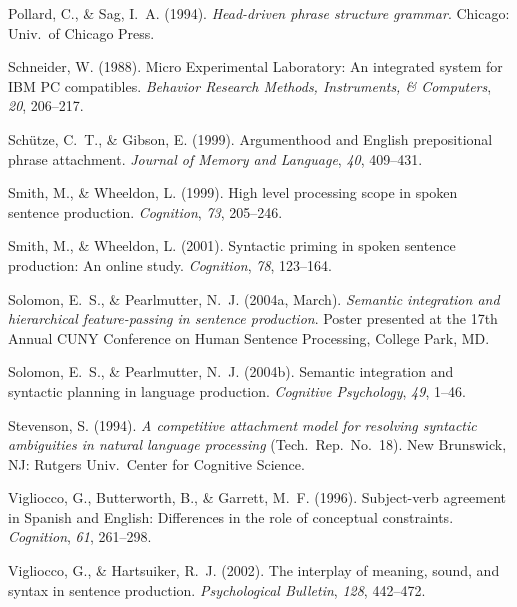 \documentclass[12pt,titlepage]{article}
\newcommand{\itt}{\textit}  %
\begin{document}
\begin{description}
    \item Pollard, C., \& Sag, I.~A\@.  (1994).  \itt{Head-driven phrase
    structure grammar}.  Chicago: Univ.\ of Chicago Press.

    \item Schneider, W\@.  (1988).  Micro Experimental Laboratory: An
    integrated system for IBM PC compatibles.  \itt{Behavior Research
    Methods, Instruments, \& Computers}, \itt{20}, 206--217.
    
    \item Sch\"{u}tze, C.~T., \& Gibson, E\@.  (1999).  Argumenthood and
    English prepositional phrase attachment.  \itt{Journal of Memory and
    Language}, \itt{40}, 409--431.

    \item Smith, M., \& Wheeldon, L\@.  (1999).  High level processing
    scope in spoken sentence production.  \itt{Cognition}, \itt{73},
    205--246.

    \item Smith, M., \& Wheeldon, L\@.  (2001).  Syntactic priming in
    spoken sentence production: An online study.  \itt{Cognition},
    \itt{78}, 123--164.

    \item Solomon, E.~S., \& Pearlmutter, N.~J\@.  (2004a, March).
    \itt{Semantic integration and hierarchical feature-passing in sentence
    production}.  Poster presented at the 17th Annual CUNY Conference on
    Human Sentence Processing, College Park, MD.
    
    \item Solomon, E.~S., \& Pearlmutter, N.~J\@.  (2004b).  Semantic
    integration and syntactic planning in language production.
    \itt{Cognitive Psychology}, \itt{49}, 1--46.
    
    \item Stevenson, S\@.  (1994).  \itt{A competitive attachment model for
    resolving syntactic ambiguities in natural language processing} (Tech.\
    Rep.\ No.\ 18).  New Brunswick, NJ: Rutgers Univ.\ Center for Cognitive
    Science.
    
    \item Vigliocco, G., Butterworth, B., \& Garrett, M.~F\@.  (1996).
    Subject-verb agreement in Spanish and English: Differences in the role
    of conceptual constraints.  \itt{Cognition}, \itt{61}, 261--298.

    \item Vigliocco, G., \& Hartsuiker, R.~J\@.  (2002).  The interplay of
    meaning, sound, and syntax in sentence production.  \itt{Psychological
    Bulletin}, \itt{128}, 442--472.
    

\end{description}
\end{document}
